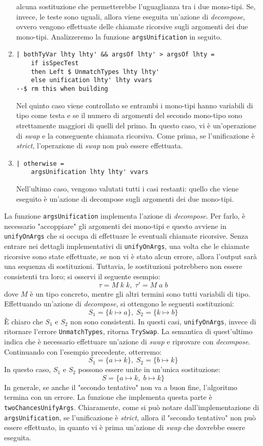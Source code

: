 \documentclass[10pt,a4paper]{article}
\begin{document}
\begin{enumerate}
    alcuna sostituzione che permetterebbe l'uguaglianza tra i due mono-tipi. Se, invece, le teste sono uguali, allora
    viene eseguita un'azione di \textit{decompose}, ovvero vengono effettuate delle chiamate ricorsive sugli argomenti
    dei due mono-tipi. Analizzeremo la funzione \texttt{argsUnification} in seguito.
    \item
    \begin{lstlisting}
| bothTyVar lhty lhty' && argsOf lhty' > argsOf lhty =
    if isSpecTest
    then Left $ UnmatchTypes lhty lhty'
    else unification lhty' lhty vvars
--$ rm this when building
    \end{lstlisting}
    Nel quinto caso viene controllato se entrambi i mono-tipi hanno variabili di tipo come testa e se il numero di
    argomenti del secondo mono-tipo sono strettamente maggiori di quelli del primo. In questo caso, vi è un'operazione
    di \textit{swap} e la conseguente chiamata ricorsiva. Come prima, se l'unificazione è \textit{strict},
    l'operazione di \textit{swap} non può essere effettuata.
    \item
    \begin{lstlisting}
| otherwise =
    argsUnification lhty lhty' vvars
    \end{lstlisting}
    Nell'ultimo caso, vengono valutati tutti i casi restanti: quello che viene eseguito è un'azione di decompose sugli
    argomenti dei due mono-tipi.
\end{enumerate}

La funzione \texttt{argsUnification} implementa l'azione di \textit{decompose}. Per farlo, è necessario "accoppiare" gli
argomenti dei mono-tipi e questo avviene in \texttt{unifyOnArgs} che si occupa di effettuare le eventuali chiamate
ricorsive. Senza entrare nei dettagli implementativi di \texttt{unifyOnArgs}, una volta che le chiamate ricorsive sono
state effettuate, se non vi è stato alcun errore, allora l'output sarà una sequenza di sostituzioni. Tuttavia, le
sostituzioni potrebbero non essere consistenti tra loro; si osservi il seguente esempio:
\[ \tau = M \; k \; k, \; \tau' = M \; a \; b \]
dove $ M $ è un tipo concreto, mentre gli altri termini sono tutti variabili di tipo. Effettuando un'azione di
\textit{decompose}, si ottengono le seguenti sostituzioni:
\[ S_1 = \{k \mapsto a\}, \; S_2 = \{k \mapsto b\} \]
\`E chiaro che $ S_1 $ e $ S_2 $ non sono consistenti. In questi casi, \texttt{unifyOnArgs}, invece di ritornare
l'errore \texttt{UnmatchTypes}, ritorna \texttt{TrySwap}. La semantica di quest'ultimo indica che è necessario effettuare
un'azione di \textit{swap} e riprovare con \textit{decompose}. Continuando con l'esempio precedente, otterremo:
\[ S_1 = \{a \mapsto k\}, \; S_2 = \{b \mapsto k\} \]
In questo caso, $ S_1 $ e $ S_2 $ possono essere unite in un'unica sostituzione:
\[ S = \{ a \mapsto k, \; b \mapsto k \} \]
In generale, se anche il "secondo tentativo" non va a buon fine, l'algoritmo termina con un errore. La funzione che
implementa questa parte è \texttt{twoChancesUnifyArgs}. Chiaramente, come si può notare dall'implementazione di
\texttt{argsUnification}, se l'unificazione è \textit{strict}, allora il "secondo tentativo" non può essere effettuato,
in quanto vi è prima un'azione di \textit{swap} che dovrebbe essere eseguita.
\end{document}
